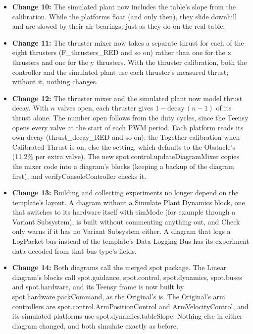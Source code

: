 \documentclass[11pt]{article}
\begin{document}
\begin{itemize}[label={\textcolor{primaryColor}{\textbullet}}]
    \item \textbf{Change 10:} The simulated plant now includes the table's slope from the calibration. While the platforms float (and only then), they slide downhill and are slowed by their air bearings, just as they do on the real table.
    \item \textbf{Change 11:} The thruster mixer now takes a separate thrust for each of the eight thrusters (F\_thrusters\_RED and so on) rather than one for the x thrusters and one for the y thrusters. With the thruster calibration, both the controller and the simulated plant use each thruster's measured thrust; without it, nothing changes.
    \item \textbf{Change 12:} The thruster mixer and the simulated plant now model thrust decay. With $n$ valves open, each thruster gives $1 - \text{decay}\,(n-1)$ of its thrust alone. The number open follows from the duty cycles, since the Teensy opens every valve at the start of each PWM period. Each platform reads its own decay (thrust\_decay\_RED and so on): the Together calibration when Calibrated Thrust is on, else the setting, which defaults to the Obstacle's (11.2\% per extra valve). The new spot.control.\allowbreak updateDiagramMixer copies the mixer code into a diagram's blocks (keeping a backup of the diagram first), and verifyConsoleController checks it.
    \item \textbf{Change 13:} Building and collecting experiments no longer depend on the template's layout. A diagram without a Simulate Plant Dynamics block, one that switches to its hardware itself with simMode (for example through a Variant Subsystem), is built without commenting anything out, and Check only warns if it has no Variant Subsystem either. A diagram that logs a LogPacket bus instead of the template's Data Logging Bus has its experiment data decoded from that bus type's fields.
    \item \textbf{Change 14:} Both diagrams call the merged spot package. The Linear diagram's blocks call spot.guidance, spot.control, spot.dynamics, spot.buses and spot.hardware, and its Teensy frame is now built by spot.hardware.packCommand, as the Original's is. The Original's arm controllers are spot.control.ArmPositionControl and ArmVelocityControl, and its simulated platforms use spot.dynamics.tableSlope. Nothing else in either diagram changed, and both simulate exactly as before.
\end{itemize}

\end{document}
